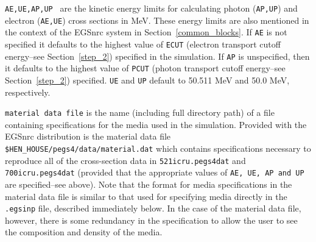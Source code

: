 \documentclass[12pt,twoside]{article}  %
\begin{document}
\begin{description}
\item {\tt AE,UE,AP,UP } are the kinetic energy limits for calculating photon ({\tt AP,UP}) and electron ({\tt AE,UE}) cross sections in
MeV.  These energy limits are also mentioned in the context of the EGSnrc system in Section~\ref{common_blocks}.
If {\tt AE} is
not specified it defaults to the highest value of {\tt ECUT} (electron transport cutoff energy--see Section~\ref{step_2}) specified
in the simulation.  If
{\tt AP} is unspecified, then it defaults to the highest value of {\tt PCUT} (photon transport cutoff energy--see Section~\ref{step_2})
specified.  {\tt UE} and {\tt UP} default to 50.511 MeV and 50.0 MeV, respectively.

\item {\tt material data file} is the name (including full directory path) of a file containing specifications for the media used
in the simulation.  Provided with the EGSnrc distribution is the material data file {\tt \$HEN\_HOUSE/pegs4/data/material.dat} which
contains specifications necessary to reproduce all of the cross-section data in {\tt 521icru.pegs4dat} and {\tt 700icru.pegs4dat}
(provided that the appropriate values of {\tt AE, UE, AP and UP} are specified--see above).  Note that the format for
media specifications in the material data file is similar to that used for specifying media directly in the
{\tt .egsinp} file, described immediately below.  In the case of the material data file, however, there is some redundancy in the specification to allow the
user to see the composition and density of the media.


\end{description}
\end{document}
